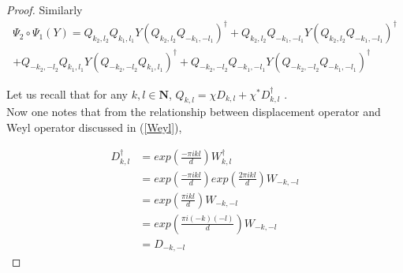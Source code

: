 \documentclass[12pt]{amsart}
\numberwithin{equation}{section}
\begin{document}
\begin{proof}
    

    Similarly \\
\begin{equation}\label{W1} \begin{split}
    \Psi_2 \circ \Psi_1 (Y)=Q_{k_2,l_2} Q_{k_1,l_1} Y \left( Q_{k_2,l_2} Q_{-k_1,-l_1}\right)^{\dagger} + Q_{k_2,l_2} Q_{-k_1,-l_1} Y \left( Q_{k_2,l_2} Q_{-k_1,-l_1}\right)^{\dagger}\\[1ex]
+Q_{-k_2,-l_2} Q_{k_1,l_1} Y \left( Q_{-k_2,-l_2} Q_{k_1,l_1}\right)^{\dagger}+Q_{-k_2,-l_2} Q_{-k_1,-l_1} Y \left( Q_{-k_2,-l_2} Q_{-k_1,-l_1}\right)^{\dagger}
\end{split}
 \end{equation}
 \vspace{0.2cm}
 
    Let us recall that for any $k,l\in \mathbf{N}$,  $Q_{k,l}=\chi D_{k,l} + \chi^{*} D_{k,l}^{\dagger}$ .\\
    
    
    Now one notes that from the relationship between displacement operator and Weyl operator discussed in (\ref{Weyl}),
       
        \begin{equation}\label{dagger}
            \begin{split}
                D_{k,l}^{\dagger}&=exp \left( \frac{-\pi i kl}{d}\right) W_{k,l}^{\dagger}\\
                &=exp \left( \frac{-\pi i kl}{d}\right)exp \left( \frac{2\pi i kl}{d}\right)W_{-k,-l}\\
                &=exp \left( \frac{\pi i kl}{d}\right)W_{-k,-l}\\
                &=exp \left( \frac{\pi i (-k)(-l)}{d}\right)W_{-k,-l}\\
                &=D_{-k,-l}
            \end{split}
        \end{equation}
          

\end{proof}
\end{document}
